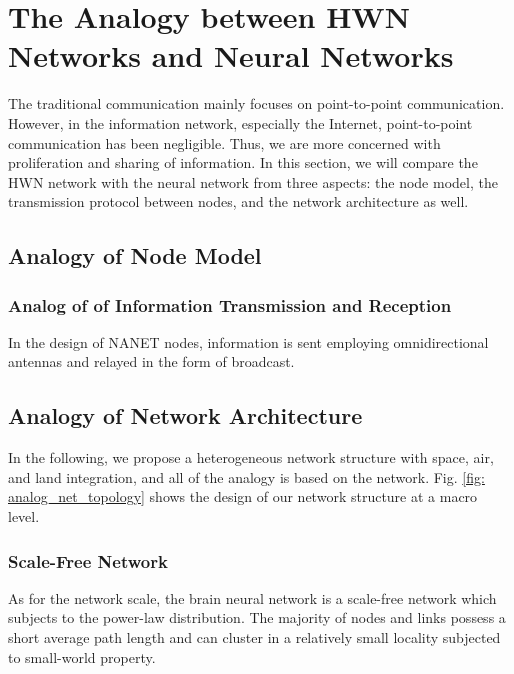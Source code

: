 \documentclass[journal,comsoc]{IEEEtran}
\begin{document}
	\section{The Analogy between HWN Networks and Neural Networks}
	\label{section: analogy}
		The traditional communication mainly focuses on point-to-point communication.
		However, in the information network, especially the Internet, point-to-point communication has been negligible. 
		Thus, we are more concerned with proliferation and sharing of information.
		In this section, we will compare the HWN network with the neural network from three aspects: the node model, the transmission protocol between nodes, and the network architecture as well.
					
		\subsection{Analogy of Node Model}
		\label{subsec: analogy_of_node_model}
					
			\subsubsection{Analog of of Information Transmission and Reception}
				In the design of NANET nodes, information is sent employing omnidirectional antennas and relayed in the form of broadcast. 

		\subsection{Analogy of Network Architecture}
			
			In the following, we propose a heterogeneous network structure with space, air, and land integration, and all of the analogy is based on the network.
			Fig. \ref{fig: analog_net_topology} shows the design of our network structure at a macro level.
%			
			\subsubsection{Scale-Free Network}
				As for the network scale, the brain neural network is a scale-free network which subjects to the power-law distribution. 
				The majority of nodes and links possess a short average path length and can cluster in a relatively small locality subjected to small-world property.
				
\end{document}
